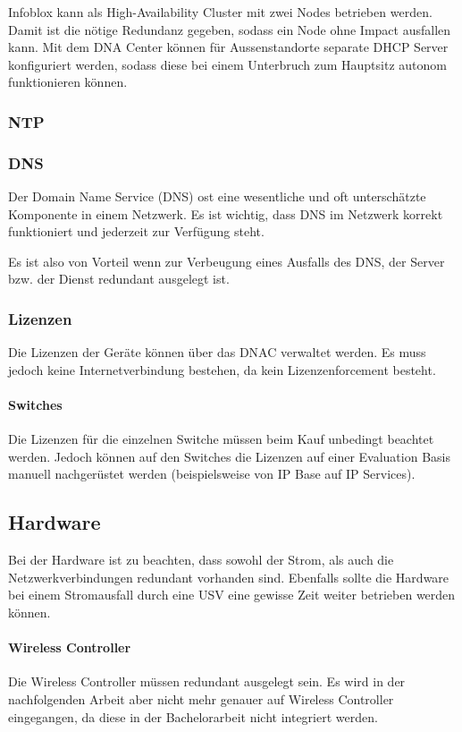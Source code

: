 Infoblox kann als High-Availability Cluster mit zwei Nodes betrieben werden. Damit ist die nötige Redundanz gegeben, sodass ein Node ohne Impact ausfallen kann. Mit dem DNA Center können für Aussenstandorte separate DHCP Server konfiguriert werden, sodass diese bei einem Unterbruch zum Hauptsitz autonom funktionieren können.

\subsubsection{NTP}


\subsubsection{DNS}
Der Domain Name Service (DNS) ost eine wesentliche und oft unterschätzte Komponente in einem Netzwerk. Es ist wichtig, dass DNS im Netzwerk korrekt funktioniert und jederzeit zur Verfügung steht.

Es ist also von Vorteil wenn zur Verbeugung eines Ausfalls des DNS, der Server bzw. der Dienst redundant ausgelegt ist.

\subsubsection{Lizenzen}
Die Lizenzen der Geräte können über das DNAC verwaltet werden. Es muss jedoch keine Internetverbindung bestehen, da kein Lizenzenforcement besteht.

\paragraph{Switches}
Die Lizenzen für die einzelnen Switche müssen beim Kauf unbedingt beachtet werden. Jedoch können auf den Switches die Lizenzen auf einer Evaluation Basis manuell nachgerüstet werden (beispielsweise von IP Base auf IP Services).

\subsection{Hardware}
Bei der Hardware ist zu beachten, dass sowohl der Strom, als auch die Netzwerkverbindungen redundant vorhanden sind. Ebenfalls sollte die Hardware bei einem Stromausfall durch eine USV eine gewisse Zeit weiter betrieben werden können.

\paragraph{Wireless Controller}
Die Wireless Controller müssen redundant ausgelegt sein. Es wird in der nachfolgenden Arbeit aber nicht mehr genauer auf Wireless Controller eingegangen, da diese in der Bachelorarbeit nicht integriert werden.

